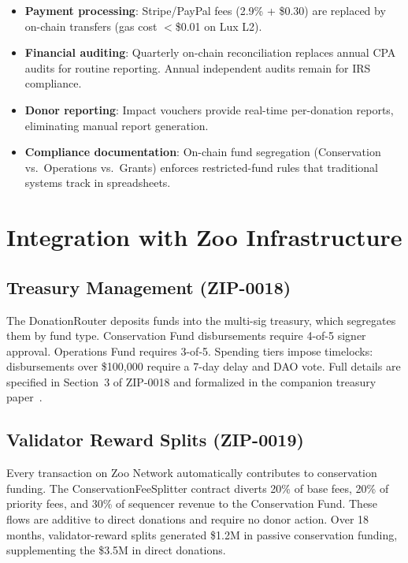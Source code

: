 \documentclass[11pt,letterpaper]{article}
\begin{document}
\begin{itemize}
    \item \textbf{Payment processing}: Stripe/PayPal fees (2.9\% + \$0.30) are replaced by on-chain transfers (gas cost $<$\$0.01 on Lux L2).
    \item \textbf{Financial auditing}: Quarterly on-chain reconciliation replaces annual CPA audits for routine reporting. Annual independent audits remain for IRS compliance.
    \item \textbf{Donor reporting}: Impact vouchers provide real-time per-donation reports, eliminating manual report generation.
    \item \textbf{Compliance documentation}: On-chain fund segregation (Conservation vs.\ Operations vs.\ Grants) enforces restricted-fund rules that traditional systems track in spreadsheets.
\end{itemize}

\section{Integration with Zoo Infrastructure}

\subsection{Treasury Management (ZIP-0018)}

The DonationRouter deposits funds into the multi-sig treasury, which segregates them by fund type. Conservation Fund disbursements require 4-of-5 signer approval. Operations Fund requires 3-of-5. Spending tiers impose timelocks: disbursements over \$100{,}000 require a 7-day delay and DAO vote. Full details are specified in Section~3 of ZIP-0018 and formalized in the companion treasury paper~\cite{zoofundtreasury2025}.

\subsection{Validator Reward Splits (ZIP-0019)}

Every transaction on Zoo Network automatically contributes to conservation funding. The ConservationFeeSplitter contract diverts 20\% of base fees, 20\% of priority fees, and 30\% of sequencer revenue to the Conservation Fund. These flows are additive to direct donations and require no donor action. Over 18 months, validator-reward splits generated \$1.2M in passive conservation funding, supplementing the \$3.5M in direct donations.
\end{document}
